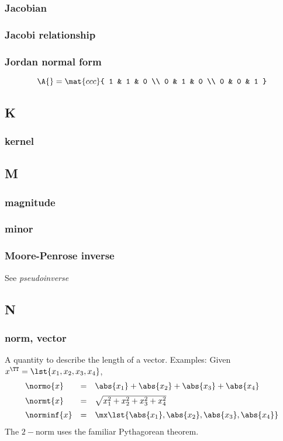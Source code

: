 \subsubsection*{Jacobian}

\subsubsection*{Jacobi relationship}

\subsubsection*{Jordan normal form}
\begin{equation}
  \A{} = 
  \mat{ccc}{
  1 & 1 & 0 \\
  0 & 1 & 0 \\
  0 & 0 & 1
  }
\end{equation}


\subsection*{K} 

\subsubsection*{kernel}

\subsection*{M} 

\subsubsection*{magnitude}

\subsubsection*{minor}

\subsubsection*{Moore-Penrose inverse}
See {\it pseudoinverse}

\subsection*{N} 

\subsubsection*{norm, vector}
A quantity to describe the length of a vector.
Examples: Given $x^{\TT}=\lst{x_1,x_2,x_3,x_4}$,
$$
\begin{array}{ lcl }
    \normo{x}   &=& \abs{x_1}+\abs{x_2}+\abs{x_3}+\abs{x_4} \\[5pt]
    \normt{x}   &=& \sqrt{x_1^2+x_2^2+x_3^2+x_4^2} \\[5pt]
    \norminf{x} &=& \mx \lst{\abs{x_1},\abs{x_2},\abs{x_3},\abs{x_4}} \\
\end{array}
$$
The $2-$norm uses the familiar Pythagorean theorem.


